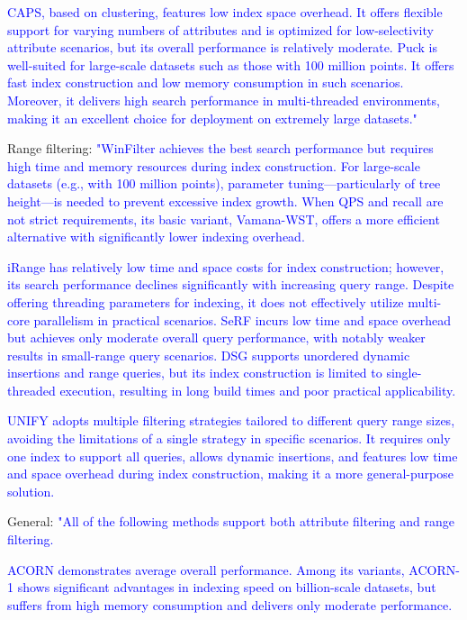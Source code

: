 \documentclass[sigconf, nonacm]{acmart}
\begin{document}
\textcolor{blue}{
	CAPS, based on clustering, features low index space overhead. It offers flexible support for varying numbers of attributes and is optimized for low-selectivity attribute scenarios, but its overall performance is relatively moderate.
	Puck is well-suited for large-scale datasets such as those with 100 million points. It offers fast index construction and low memory consumption in such scenarios. Moreover, it delivers high search performance in multi-threaded environments, making it an excellent choice for deployment on extremely large datasets."}



Range filtering:\textcolor{blue}{
	"WinFilter achieves the best search performance but requires high time and memory resources during index construction. For large-scale datasets (e.g., with 100 million points), parameter tuning—particularly of tree height—is needed to prevent excessive index growth. When QPS and recall are not strict requirements, its basic variant, Vamana-WST, offers a more efficient alternative with significantly lower indexing overhead.
}

\textcolor{blue}{
	iRange has relatively low time and space costs for index construction; however, its search performance declines significantly with increasing query range. Despite offering threading parameters for indexing, it does not effectively utilize multi-core parallelism in practical scenarios.
	SeRF incurs low time and space overhead but achieves only moderate overall query performance, with notably weaker results in small-range query scenarios.
	DSG supports unordered dynamic insertions and range queries, but its index construction is limited to single-threaded execution, resulting in long build times and poor practical applicability.}

\textcolor{blue}{
	UNIFY adopts multiple filtering strategies tailored to different query range sizes, avoiding the limitations of a single strategy in specific scenarios. It requires only one index to support all queries, allows dynamic insertions, and features low time and space overhead during index construction, making it a more general-purpose solution.}
	
General:	\textcolor{blue}{"All of the following methods support both attribute filtering and range filtering.}
	
	\textcolor{blue}{
		ACORN demonstrates average overall performance. Among its variants, ACORN-1 shows significant advantages in indexing speed on billion-scale datasets, but suffers from high memory consumption and delivers only moderate performance.}
	
\end{document}
